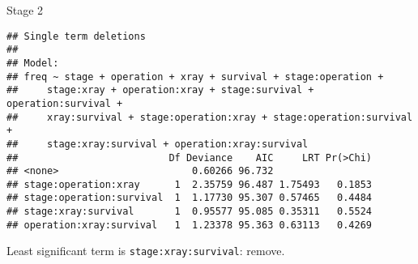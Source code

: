 \begin{frame}[fragile]{Stage 2}
  
{\footnotesize
\begin{knitrout}
\color{fgcolor}\begin{kframe}
\begin{alltt}
\hlkwb{=}\hlopt{~}
\hlopt{-}\hlopt{:}\hlopt{:}\hlopt{:}
\hlstd{=}\hlstd{)}
\end{alltt}
\begin{verbatim}
## Single term deletions
## 
## Model:
## freq ~ stage + operation + xray + survival + stage:operation + 
##     stage:xray + operation:xray + stage:survival + operation:survival + 
##     xray:survival + stage:operation:xray + stage:operation:survival + 
##     stage:xray:survival + operation:xray:survival
##                          Df Deviance    AIC     LRT Pr(>Chi)
## <none>                       0.60266 96.732                 
## stage:operation:xray      1  2.35759 96.487 1.75493   0.1853
## stage:operation:survival  1  1.17730 95.307 0.57465   0.4484
## stage:xray:survival       1  0.95577 95.085 0.35311   0.5524
## operation:xray:survival   1  1.23378 95.363 0.63113   0.4269
\end{verbatim}
\end{kframe}
\end{knitrout}
}

Least significant term is \texttt{stage:xray:survival}: remove.

  
\end{frame}



